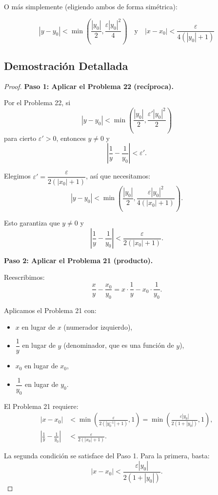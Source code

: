 O más simplemente (eligiendo ambos de forma simétrica):

\[
\boxed{|y - y_0| < \min\left(\frac{|y_0|}{2}, \frac{\varepsilon|y_0|^2}{4}\right) \quad \text{y} \quad |x - x_0| < \frac{\varepsilon}{4(|y_0|+1)}}
\]

\subsection*{Demostración Detallada}

\begin{proof}

\textbf{Paso 1: Aplicar el Problema 22 (recíproca).}

Por el Problema 22, si 
\[
|y - y_0| < \min\left(\frac{|y_0|}{2}, \frac{\varepsilon'|y_0|^2}{2}\right)
\]
para cierto $\varepsilon' > 0$, entonces $y \neq 0$ y 
\[
\left|\frac{1}{y} - \frac{1}{y_0}\right| < \varepsilon'.
\]

Elegimos $\varepsilon' = \dfrac{\varepsilon}{2(|x_0|+1)}$, así que necesitamos:
\[
|y - y_0| < \min\left(\frac{|y_0|}{2}, \frac{\varepsilon|y_0|^2}{4(|x_0|+1)}\right).
\]

Esto garantiza que $y \neq 0$ y
\[
\left|\frac{1}{y} - \frac{1}{y_0}\right| < \frac{\varepsilon}{2(|x_0|+1)}.
\]

\textbf{Paso 2: Aplicar el Problema 21 (producto).}

Reescribimos:
\[
\frac{x}{y} - \frac{x_0}{y_0} = x \cdot \frac{1}{y} - x_0 \cdot \frac{1}{y_0}.
\]

Aplicamos el Problema 21 con:
\begin{itemize}
\item $x$ en lugar de $x$ (numerador izquierdo),
\item $\dfrac{1}{y}$ en lugar de $y$ (denominador, que es una función de $y$),
\item $x_0$ en lugar de $x_0$,
\item $\dfrac{1}{y_0}$ en lugar de $y_0$.
\end{itemize}

El Problema 21 requiere:
\begin{align*}
|x - x_0| &< \min\left(\frac{\varepsilon}{2(|y_0^{-1}|+1)}, 1\right) = \min\left(\frac{\varepsilon|y_0|}{2(1+|y_0|)}, 1\right), \\
\left|\frac{1}{y} - \frac{1}{y_0}\right| &< \frac{\varepsilon}{2(|x_0|+1)}.
\end{align*}

La segunda condición se satisface del Paso 1. Para la primera, basta:
\[
|x - x_0| < \frac{\varepsilon|y_0|}{2(1+|y_0|)}.
\]


\end{proof}

